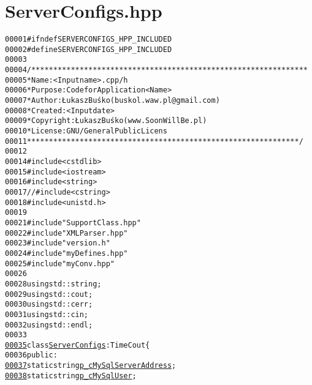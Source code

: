 \hypertarget{ServerConfigs_8hpp_source}{
\section{ServerConfigs.hpp}
}


\begin{footnotesize}\begin{alltt}
00001 \textcolor{preprocessor}{#ifndef SERVERCONFIGS\_HPP\_INCLUDED}
00002 \textcolor{preprocessor}{}\textcolor{preprocessor}{#define SERVERCONFIGS\_HPP\_INCLUDED}
00003 \textcolor{preprocessor}{}
00004 \textcolor{comment}{/***************************************************************}
00005 \textcolor{comment}{ * Name:      <Input name>.cpp/h}
00006 \textcolor{comment}{ * Purpose:   Code for Application <Name>}
00007 \textcolor{comment}{ * Author:    Łukasz Buśko (buskol.waw.pl@gmail.com)}
00008 \textcolor{comment}{ * Created:   <Input date>}
00009 \textcolor{comment}{ * Copyright: Łukasz Buśko (www.SoonWillBe.pl)}
00010 \textcolor{comment}{ * License:   GNU / General Public Licens}
00011 \textcolor{comment}{ **************************************************************/}
00012 
00014 \textcolor{preprocessor}{#include <cstdlib>}
00015 \textcolor{preprocessor}{#include <iostream>}
00016 \textcolor{preprocessor}{#include <string>}
00017 \textcolor{comment}{//#include <cstring>}
00018 \textcolor{preprocessor}{#include <unistd.h>}
00019 
00021 \textcolor{preprocessor}{#include "SupportClass.hpp"}
00022 \textcolor{preprocessor}{#include "XMLParser.hpp"}
00023 \textcolor{preprocessor}{#include "version.h"}
00024 \textcolor{preprocessor}{#include "myDefines.hpp"}
00025 \textcolor{preprocessor}{#include "myConv.hpp"}
00026 
00028 \textcolor{keyword}{using} std::string;
00029 \textcolor{keyword}{using} std::cout;
00030 \textcolor{keyword}{using} std::cerr;
00031 \textcolor{keyword}{using} std::cin;
00032 \textcolor{keyword}{using} std::endl;
00033 
\hypertarget{ServerConfigs_8hpp_source_l00035}{}\hyperlink{classServerConfigs}{00035} \textcolor{keyword}{class }\hyperlink{classServerConfigs}{ServerConfigs}: TimeCout\{
00036     \textcolor{keyword}{public}:
\hypertarget{ServerConfigs_8hpp_source_l00037}{}\hyperlink{classServerConfigs_a25ce60fcec7cc2b3a2d6e527d086e6c3}{00037}         \textcolor{keyword}{static} \textcolor{keywordtype}{string} \hyperlink{classServerConfigs_a25ce60fcec7cc2b3a2d6e527d086e6c3}{p_cMySqlServerAddress};
\hypertarget{ServerConfigs_8hpp_source_l00038}{}\hyperlink{classServerConfigs_ac394f376322427f07ce2de08f3dabdf2}{00038}         \textcolor{keyword}{static} \textcolor{keywordtype}{string} \hyperlink{classServerConfigs_ac394f376322427f07ce2de08f3dabdf2}{p_cMySqlUser};

\end{alltt}
\end{footnotesize}
